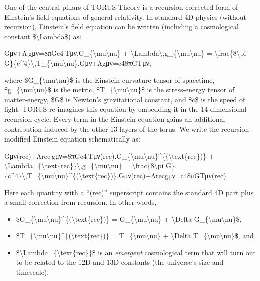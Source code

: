 \documentclass[]{article}
\begin{document}
One of the central pillars of TORUS Theory is a recursion-corrected form
of Einstein's field equations of general relativity. In standard 4D
physics (without recursion), Einstein's field equation can be written
(including a cosmological constant \$\textbackslash{}Lambda\$) as:

Gμν+Λ gμν=8πGc4 Tμν,G\_\{\textbackslash{}mu\textbackslash{}nu\} +
\textbackslash{}Lambda\textbackslash{},g\_\{\textbackslash{}mu\textbackslash{}nu\}
= \textbackslash{}frac\{8\textbackslash{}pi
G\}\{c\^{}4\}\textbackslash{},T\_\{\textbackslash{}mu\textbackslash{}nu\},Gμν​+Λgμν​=c48πG​Tμν​,

where \$G\_\{\textbackslash{}mu\textbackslash{}nu\}\$ is the Einstein
curvature tensor of spacetime,
\$g\_\{\textbackslash{}mu\textbackslash{}nu\}\$ is the metric,
\$T\_\{\textbackslash{}mu\textbackslash{}nu\}\$ is the stress-energy
tensor of matter-energy, \$G\$ is Newton's gravitational constant, and
\$c\$ is the speed of light. TORUS re-imagines this equation by
embedding it in the 14-dimensional recursion cycle. Every term in the
Einstein equation gains an additional contribution induced by the other
13 layers of the torus. We write the recursion-modified Einstein
equation schematically as:

Gμν(rec)+Λrec gμν=8πGc4 Tμν(rec).G\_\{\textbackslash{}mu\textbackslash{}nu\}\^{}\{(\textbackslash{}text\{rec\})\}
+
\textbackslash{}Lambda\_\{\textbackslash{}text\{rec\}\}\textbackslash{},g\_\{\textbackslash{}mu\textbackslash{}nu\}
= \textbackslash{}frac\{8\textbackslash{}pi
G\}\{c\^{}4\}\textbackslash{},T\_\{\textbackslash{}mu\textbackslash{}nu\}\^{}\{(\textbackslash{}text\{rec\})\}.Gμν(rec)​+Λrec​gμν​=c48πG​Tμν(rec)​.

Here each quantity with a ``(rec)'' superscript contains the standard 4D
part plus a small correction from recursion. In other words,

\begin{itemize}
\item
  \$G\_\{\textbackslash{}mu\textbackslash{}nu\}\^{}\{(\textbackslash{}text\{rec\})\}
  = G\_\{\textbackslash{}mu\textbackslash{}nu\} + \textbackslash{}Delta
  G\_\{\textbackslash{}mu\textbackslash{}nu\}\$,
\item
  \$T\_\{\textbackslash{}mu\textbackslash{}nu\}\^{}\{(\textbackslash{}text\{rec\})\}
  = T\_\{\textbackslash{}mu\textbackslash{}nu\} + \textbackslash{}Delta
  T\_\{\textbackslash{}mu\textbackslash{}nu\}\$, and
\item
  \$\textbackslash{}Lambda\_\{\textbackslash{}text\{rec\}\}\$ is an
  \emph{emergent} cosmological term that will turn out to be related to
  the 12D and 13D constants (the universe's size and timescale).
\end{itemize}
\end{document}
